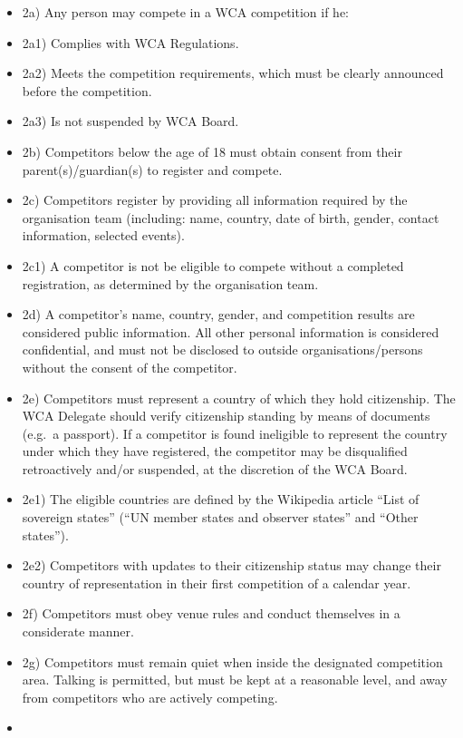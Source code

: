 \begin{itemize}
\item
  2a) Any person may compete in a WCA competition if he:
\item
  2a1) Complies with WCA Regulations.
\item
  2a2) Meets the competition requirements, which must be clearly
  announced before the competition.
\item
  2a3) Is not suspended by WCA Board.
\item
  2b) Competitors below the age of 18 must obtain consent from their
  parent(s)/guardian(s) to register and compete.
\item
  2c) Competitors register by providing all information required by the
  organisation team (including: name, country, date of birth, gender,
  contact information, selected events).
\item
  2c1) A competitor is not be eligible to compete without a completed
  registration, as determined by the organisation team.
\item
  2d) A competitor's name, country, gender, and competition results are
  considered public information. All other personal information is
  considered confidential, and must not be disclosed to outside
  organisations/persons without the consent of the competitor.
\item
  2e) Competitors must represent a country of which they hold
  citizenship. The WCA Delegate should verify citizenship standing by
  means of documents (e.g.~a passport). If a competitor is found
  ineligible to represent the country under which they have registered,
  the competitor may be disqualified retroactively and/or suspended, at
  the discretion of the WCA Board.
\item
  2e1) The eligible countries are defined by the Wikipedia article
  ``List of sovereign states'' (``UN member states and observer states''
  and ``Other states'').
\item
  2e2) Competitors with updates to their citizenship status may change
  their country of representation in their first competition of a
  calendar year.
\item
  2f) Competitors must obey venue rules and conduct themselves in a
  considerate manner.
\item
  2g) Competitors must remain quiet when inside the designated
  competition area. Talking is permitted, but must be kept at a
  reasonable level, and away from competitors who are actively
  competing.
\item

\end{itemize}
